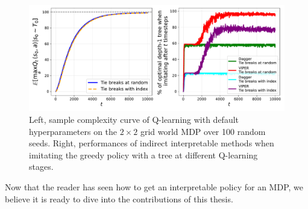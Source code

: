 \begin{figure}
    \centering
    \includegraphics[width=1\textwidth]{images/images_part1/base_mdp.pdf}
    \caption{Left, sample complexity curve of Q-learning with default hyperparameters on the $2\times 2$ grid world MDP over 100 random seeds. Right, performances of indirect interpretable methods when imitating the greedy policy with a tree at different Q-learning stages. }
\end{figure}


Now that the reader has seen how to get an interpretable policy for an MDP, we believe it is ready to dive into the contributions of this thesis.